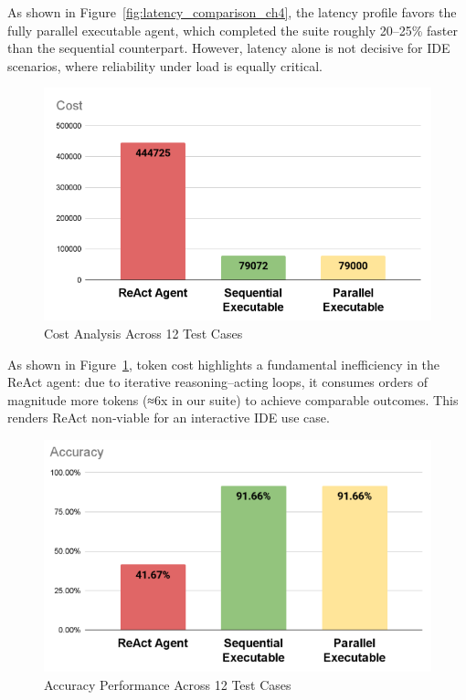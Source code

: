\begin{spacing}{1.2}
As shown in Figure~\ref{fig:latency_comparison_ch4}, the latency profile favors the fully parallel executable agent, which completed the suite roughly 20–25\% faster than the sequential counterpart. However, latency alone is not decisive for IDE scenarios, where reliability under load is equally critical.

\begin{figure}[H]
\centering
\includegraphics[scale=0.5]{images/cost.png}
\caption{Cost Analysis Across 12 Test Cases}
\label{fig:cost_comparison_ch4}
\end{figure}

As shown in Figure~\ref{fig:cost_comparison_ch4}, token cost highlights a fundamental inefficiency in the ReAct agent: due to iterative reasoning–acting loops, it consumes orders of magnitude more tokens (≈6x in our suite) to achieve comparable outcomes. This renders ReAct non‑viable for an interactive IDE use case.

\begin{figure}[H]
\centering
\includegraphics[scale=0.5]{images/accuracy.png}
\caption{Accuracy Performance Across 12 Test Cases}
\label{fig:accuracy_comparison_ch4}
\end{figure}


\end{spacing}
